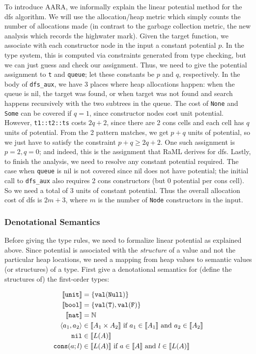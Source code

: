 \documentclass{easychair}
\newcommand{\irl}[1]{\mathtt{#1}}
\newcounter{rule}
\newcommand{\denote}[1]{\llbracket#1\rrbracket}
\newcommand{\val}[1]{\irl{val}(#1)}
\theoremstyle{definition}
\begin{document}
To introduce AARA, we informally explain the linear potential method for the dfs algorithm.
We will use the allocation/heap metric which simply counts the number of allocations made 
(in contrast to the garbage collection metric, the new analysis which records the highwater mark). 
Given the target function, we associate with each constructor node in the input a
constant potential $p$. 
In the type system, this is computed via constraints generated from type checking, but we can 
just guess and check our assignment. 
Thus, we need to give the potential assignment to \texttt{t} and \texttt{queue}; let these
constants be $p$ and $q$, respectively.
In the body of \texttt{dfs\_aux}, we have
3 places where heap allocations happen: when the queue is nil, the target was found, 
or when target was not found and search happens recursively with the two subtrees in the queue.
The cost of \texttt{None} and \texttt{Some} can be covered if $q = 1$, since constructor nodes
cost unit potential. However, \texttt{t1::t2::ts} costs $2q+2$, since there are 2 cons cells and 
each cell has $q$ units of potential. From the 2 pattern matches, we get $p+q$ units of potential,
so we just have to satisfy the constraint $p+q \ge 2q+2$. One such assignment is $p = 2, q = 0$; 
and indeed, this is the assignment that RaML derives for dfs. Lastly, to finish the analysis,
we need to resolve any constant potential required. The case when \texttt{queue} is nil is 
not covered since nil does not have potential; the initial call to \texttt{dfs\_aux} also 
requires 2 cons constructors (but 0 potential per cons cell). So we need a total of 3 units 
of constant potential. Thus the overall allocation cost of dfs is $2m+3$, where $m$ is the number 
of \texttt{Node} constructors in the input.

\subsubsection{Denotational Semantics}

Before giving the type rules, we need to formalize linear potential as explained above.
Since potential is associated with the \emph{structure} of a value and not the particular heap 
locations, we need a mapping from
heap values to semantic values (or structures) of a type. 
First give a denotational semantics for (define the structures of) the first-order types: 

\begin{align*}
	\denote{\unittyabt} &= \{\val{\irl{Null}}\}\\
	\denote{\booltyabt} &= \{\val{\irl{T}}, \val{\irl{F}}\}\\
	\denote{\irl{nat}} &= \mathbb{N}\\
\pairexcst{a_1}{a_2} &\in \denote{\prodtycst{A_1}{A_2}} 
	\text{ if } a_1 \in \denote{A_1} \text{ and } a_2 \in \denote{A_2}\\
\nilexcst &\in \denote{L(A)}\\
\consexcst{a}{l} &\in \denote{L(A)} \text{ if } a \in \denote{A} \text{ and } l \in \denote{L(A)}\\
\end{align*}
\end{document}

